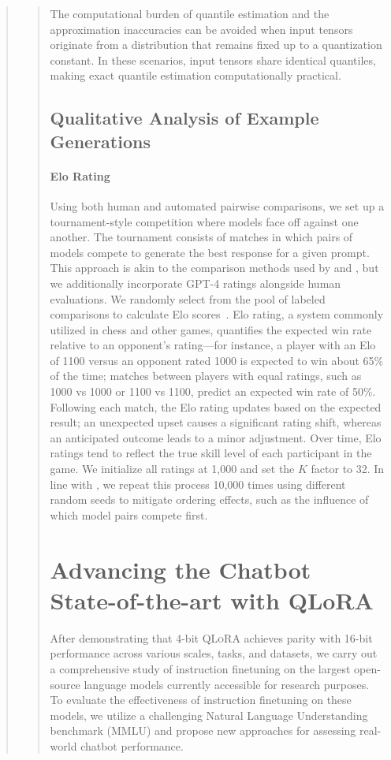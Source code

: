 \begin{quote}
\begin{quote}
The computational burden of quantile estimation and the approximation inaccuracies can be avoided when input tensors originate from a distribution that remains fixed up to a quantization constant. In these scenarios, input tensors share identical quantiles, making exact quantile estimation computationally practical.

\subsection{Qualitative Analysis of Example Generations}
\label{ssec:examples}

\paragraph{Elo Rating} Using both human and automated pairwise comparisons, we set up a tournament-style competition where models face off against one another. The tournament consists of matches in which pairs of models compete to generate the best response for a given prompt. This approach is akin to the comparison methods used by \citet{bai2022training} and \citet{vicuna2023}, but we additionally incorporate GPT-4 ratings alongside human evaluations. We randomly select from the pool of labeled comparisons to calculate Elo scores~\citep{elo1967proposed,elo1978rating}. Elo rating, a system commonly utilized in chess and other games, quantifies the expected win rate relative to an opponent's rating—for instance, a player with an Elo of 1100 versus an opponent rated 1000 is expected to win about 65\% of the time; matches between players with equal ratings, such as 1000 vs 1000 or 1100 vs 1100, predict an expected win rate of 50\%. Following each match, the Elo rating updates based on the expected result; an unexpected upset causes a significant rating shift, whereas an anticipated outcome leads to a minor adjustment. Over time, Elo ratings tend to reflect the true skill level of each participant in the game. We initialize all ratings at 1,000 and set the $K$ factor to 32. In line with \citet{vicuna2023}, we repeat this process 10,000 times using different random seeds to mitigate ordering effects, such as the influence of which model pairs compete first.

\section{Advancing the Chatbot State-of-the-art with QLoRA}
\label{sec:pushing}
After demonstrating that 4-bit \textsc{QLoRA} achieves parity with 16-bit performance across various scales, tasks, and datasets, we carry out a comprehensive study of instruction finetuning on the largest open-source language models currently accessible for research purposes. To evaluate the effectiveness of instruction finetuning on these models, we utilize a challenging Natural Language Understanding benchmark (MMLU) and propose new approaches for assessing real-world chatbot performance.


\end{quote}
\end{quote}
